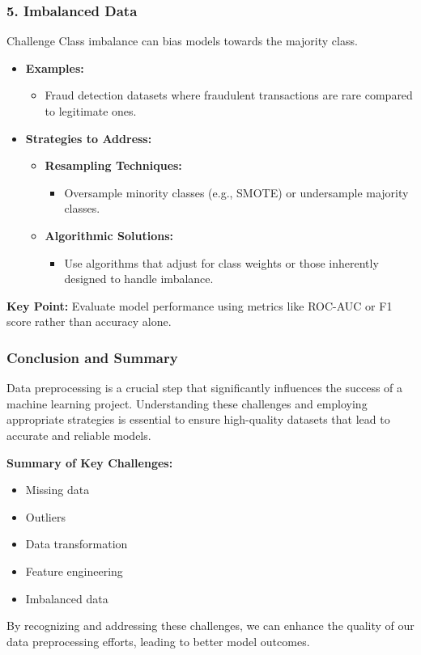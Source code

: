 \documentclass[aspectratio=169]{beamer}
\begin{document}
\begin{frame}[fragile]
  \frametitle{5. Imbalanced Data}
  \begin{block}{Challenge}
    Class imbalance can bias models towards the majority class.
  \end{block}

  \begin{itemize}
    \item \textbf{Examples:}
      \begin{itemize}
        \item Fraud detection datasets where fraudulent transactions are rare compared to legitimate ones.
      \end{itemize}

    \item \textbf{Strategies to Address:}
      \begin{itemize}
        \item \textbf{Resampling Techniques:}
          \begin{itemize}
            \item Oversample minority classes (e.g., SMOTE) or undersample majority classes.
          \end{itemize}        
        \item \textbf{Algorithmic Solutions:}
          \begin{itemize}
            \item Use algorithms that adjust for class weights or those inherently designed to handle imbalance.
          \end{itemize}
      \end{itemize}
  \end{itemize}

  \textbf{Key Point:} Evaluate model performance using metrics like ROC-AUC or F1 score rather than accuracy alone.
\end{frame}

\begin{frame}[fragile]
  \frametitle{Conclusion and Summary}
  Data preprocessing is a crucial step that significantly influences the success of a machine learning project. Understanding these challenges and employing appropriate strategies is essential to ensure high-quality datasets that lead to accurate and reliable models.

  \textbf{Summary of Key Challenges:}
  \begin{itemize}
    \item Missing data
    \item Outliers
    \item Data transformation
    \item Feature engineering
    \item Imbalanced data
  \end{itemize}

  By recognizing and addressing these challenges, we can enhance the quality of our data preprocessing efforts, leading to better model outcomes.
\end{frame}
\end{document}
